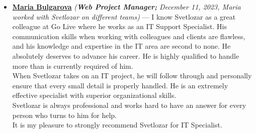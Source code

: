 \documentclass[letterpaper, 10pt]{article}
\begin{document}
\begin{itemize}
	\item \textbf{\href{https://www.linkedin.com/in/maria-bulgarova-15476b32/}{Maria
			Bulgarova}} \textit{(\textbf{Web Project Manager;} December 11, 2023, Maria  worked with Svetlozar on different teams)} — I know Svetlozar as a great colleague at Go Live where he works as an IT Support Specialist. His communication skills when working with colleagues and clients are flawless, and his knowledge and expertise in the IT area are second to none. He absolutely deserves to advance his career. He is highly qualified to handle more than is currently required of him.\\
	When Svetlozar takes on an IT project, he will follow through and personally ensure that every small detail is properly handled. He is an extremely effective specialist with superior organizational skills.\\
	Svetlozar is always professional and works hard to have an answer for every person who turns to him for help.\\
	It is my pleasure to strongly recommend Svetlozar for IT Specialist.
\end{itemize}
\end{document}
